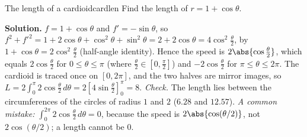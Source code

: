 \documentclass[11pt]{article}
\begin{document}
\begin{exmp}{The length of a cardioid}{cardlen}
Find the length of $r=1+\cos\theta$.

\textbf{Solution.} $f=1+\cos\theta$ and $f'=-\sin\theta$, so $f^2+f'^2=1+2\cos\theta+\cos^2\theta+\sin^2\theta=2+2\cos\theta=4\cos^2\frac\theta2$, by $1+\cos\theta=2\cos^2\frac\theta2$ (half-angle identity). Hence the speed is $2\abs{\cos\frac\theta2}$, which equals $2\cos\frac\theta2$ for $0\le\theta\le\pi$ (where $\frac\theta2\in\left[0,\frac\pi2\right]$) and $-2\cos\frac\theta2$ for $\pi\le\theta\le2\pi$. The cardioid is traced once on $[0,2\pi]$, and the two halves are mirror images, so $L=2\int_0^\pi2\cos\frac\theta2\,d\theta=2\left[4\sin\frac\theta2\right]_0^\pi=8$.
\emph{Check.} The length lies between the circumferences of the circles of radius $1$ and $2$ ($6.28$ and $12.57$). \emph{A common mistake:} $\int_0^{2\pi}2\cos\frac\theta2\,d\theta=0$, because the speed is $2\abs{\cos(\theta/2)}$, not $2\cos(\theta/2)$; a length cannot be $0$.
\end{exmp}
\end{document}
